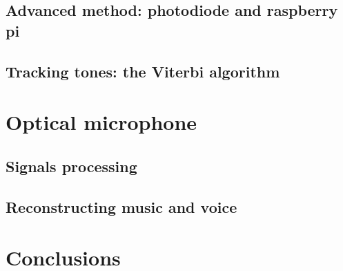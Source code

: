 \documentclass[prb,preprint]{revtex4-1}
\newcommand{\jam}{\textcolor{magenta}}
\begin{document}

\subsection{Advanced method: photodiode and raspberry pi}

\subsection{Tracking tones: the Viterbi algorithm}


\section{Optical microphone}

\subsection{Signals processing}

\subsection{Reconstructing music and voice}


\section{Conclusions}


\appendix

\newpage
\end{document}

